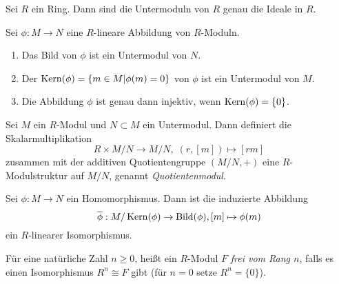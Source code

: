 \documentclass{book}
\begin{document}
\begin{exa}
    \label{exa:idealmodul} 
    Sei $R$ ein Ring. Dann sind die Untermoduln von $R$ genau die Ideale in $R$.
\end{exa}

\begin{prop} Sei $\phi: M \to N$ eine $R$-lineare Abbildung von $R$-Moduln. 
    \label{prop:kernmodul}
    \begin{enumerate}
        \item Das Bild von $\phi$ ist ein Untermodul von $N$.
        \item Der $\Kern(\phi) = \{ m \in M | \phi(m) = 0\}$ von $\phi$
            ist ein Untermodul von $M$.
        \item Die Abbildung $\phi$ ist genau dann injektiv, wenn $\Kern(\phi) = \{0\}$. 
    \end{enumerate}
\end{prop}

\begin{defi}
    \label{defi:quot}
    Sei $M$ ein $R$-Modul und $N \subset M$ ein Untermodul. Dann definiert die Skalarmultiplikation
    \[
        R \times M/N \to M/N, \; (r,[m]) \mapsto [rm]
    \]
    zusammen mit der additiven Quotientengruppe $(M/N, +)$ eine
    $R$-Modulstruktur auf $M/N$, genannt \emph{Quotientenmodul}.
\end{defi}

\begin{prop}
    \label{prop:homsatz}
    Sei $\phi: M \to N$ ein Homomorphismus. Dann ist die induzierte Abbildung
    \[
        \overline{\phi}: M/\Kern(\phi) \to \Bild(\phi), [m] \mapsto \phi(m)
    \]
    ein $R$-linearer Isomorphismus.
\end{prop}

\begin{defi}
    \label{defi:freiermodul}
    Für eine natürliche Zahl $n \ge 0$, heißt ein $R$-Modul $F$ \emph{frei vom
    Rang $n$}, falls es einen Isomorphismus $R^n \cong F$ gibt (für $n=0$ setze
    $R^n = \{0\}$). 
\end{defi}
\end{document}
